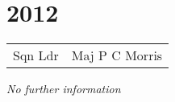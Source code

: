 \chapter*{2012}

\begin{center}
  \small
  \begin{tabular}{rl}
    Sqn Ldr & Maj P C Morris \\
  \end{tabular}
\end{center}

\begin{center}
  \textit{No further information}
\end{center}

\vspace{50mm}

\pagebreak
